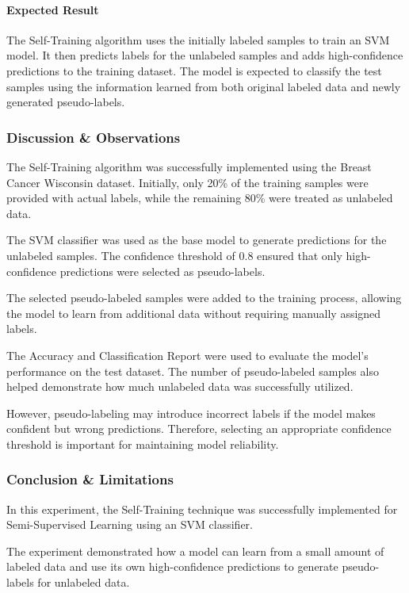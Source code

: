 \documentclass[a4paper,11pt]{article}
\begin{document}
\paragraph{Expected Result}
The Self-Training algorithm uses the initially labeled samples to train an SVM model. It then predicts labels for the unlabeled samples and adds high-confidence predictions to the training dataset. The model is expected to classify the test samples using the information learned from both original labeled data and newly generated pseudo-labels.

\subsubsection{Discussion \& Observations}

The Self-Training algorithm was successfully implemented using the Breast Cancer Wisconsin dataset. Initially, only 20\% of the training samples were provided with actual labels, while the remaining 80\% were treated as unlabeled data.

The SVM classifier was used as the base model to generate predictions for the unlabeled samples. The confidence threshold of 0.8 ensured that only high-confidence predictions were selected as pseudo-labels.

The selected pseudo-labeled samples were added to the training process, allowing the model to learn from additional data without requiring manually assigned labels.

The Accuracy and Classification Report were used to evaluate the model's performance on the test dataset. The number of pseudo-labeled samples also helped demonstrate how much unlabeled data was successfully utilized.

However, pseudo-labeling may introduce incorrect labels if the model makes confident but wrong predictions. Therefore, selecting an appropriate confidence threshold is important for maintaining model reliability.

\subsubsection{Conclusion \& Limitations}

In this experiment, the Self-Training technique was successfully implemented for Semi-Supervised Learning using an SVM classifier.

The experiment demonstrated how a model can learn from a small amount of labeled data and use its own high-confidence predictions to generate pseudo-labels for unlabeled data.
\end{document}
